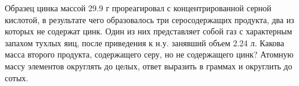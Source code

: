 
Образец цинка массой 29.9 г прореагировал с концентрированной серной кислотой, в результате чего
образовалось три серосодержащих продукта, два из которых не содержат цинк. Один
из них представляет собой газ с характерным запахом тухлых яиц, после
приведения к н.у. занявший объем 2.24 л. Какова масса второго продукта,
содержащего серу, но не содержащего цинк? Атомную массу элементов округлять до
целых, ответ выразить в граммах и округлить до сотых.



